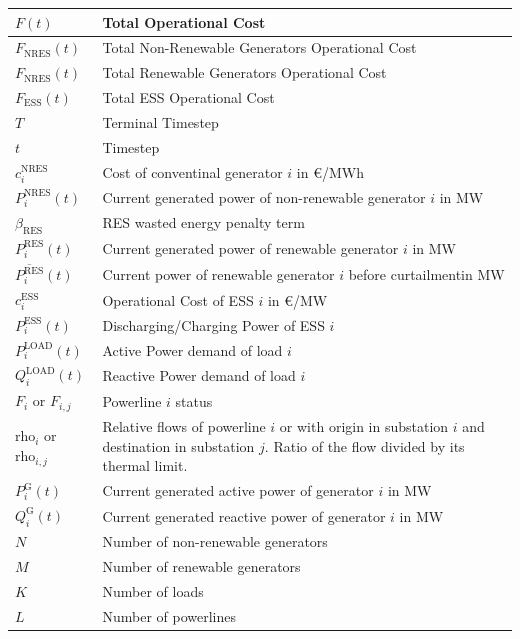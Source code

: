 \begin{center}
	\begin{tabular}{ | m{2cm} | m{10cm}| } 
		\hline
		$F(t)$ & Total Operational Cost \\ 
		\hline
		$F_\text{NRES}(t)$ & Total Non-Renewable Generators Operational Cost \\
		\hline
		$F_\text{NRES}(t)$ & Total Renewable Generators Operational Cost \\
		\hline
		$F_\text{ESS}(t)$ & Total ESS Operational Cost \\
		\hline
		$T$ & Terminal Timestep \\
		\hline
		$t$ & Timestep \\
		\hline
		$c^\text{NRES}_i$ & Cost of conventinal generator $i$ in €/MWh \\
		\hline
		$P^\text{NRES}_i(t)$ & Current generated power of non-renewable generator $i$ in MW \\
		\hline
		$\beta_\text{RES}$ & \ac{RES} wasted energy penalty term \\
		\hline
		$P^\text{RES}_i(t)$ & Current generated power of renewable generator $i$ in MW \\
		\hline
		$\overline{P^\text{RES}_i}(t)$ &  Current power of renewable generator $i$ before curtailmentin MW \\
		\hline
		$c^\text{ESS}_i$ & Operational Cost of \ac{ESS} $i$ in €/MW \\
		\hline
		$P^\text{ESS}_i(t)$ & Discharging/Charging Power of \ac{ESS} $i$ \\
		\hline
		$P^\text{LOAD}_i(t)$ & Active Power demand of load $i$ \\
		\hline
		$Q^\text{LOAD}_i(t)$ & Reactive Power demand of load $i$ \\
		\hline
		$F_i$ or $F_{i,j}$ & Powerline $i$ status \\
		\hline
		$\text{rho}_i$ or $\text{rho}_{i,j}$ & Relative flows of powerline $i$ or with origin in substation $i$ and destination in substation $j$. Ratio of the flow divided by its thermal limit. \\
		\hline
		$P^\text{G}_i(t)$ & Current generated active power of generator $i$ in MW \\
		\hline
		$Q^\text{G}_i(t)$ & Current generated reactive power of generator $i$ in MW \\
		\hline
		$N$ & Number of non-renewable generators \\
		\hline
		$M$ & Number of renewable generators \\
		\hline
		$K$ & Number of loads \\
		\hline
		$L$ & Number of powerlines \\
		\hline
	\end{tabular}
\end{center}

